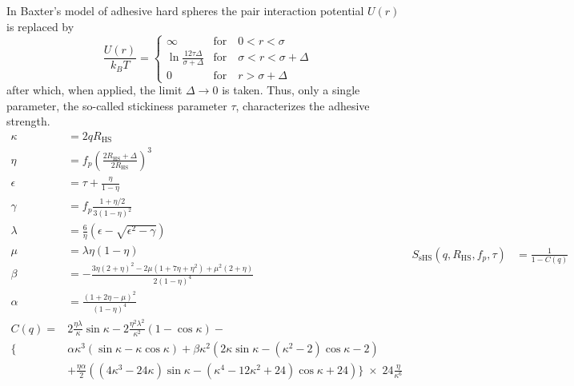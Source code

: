 In Baxter's model \cite{Baxter1968,Robertus1989,Kruif1989,Barboy1974,Menon1991,Menon1991a}
of adhesive hard spheres the pair interaction potential $U(r)$ is replaced by
\begin{equation}
\frac{U(r)}{k_BT} =
 \begin{cases}
      \infty    & \text{for} \quad 0<r<\sigma \\
      \ln\frac{12\tau\Delta}{\sigma+\Delta} & \text{for} \quad \sigma<r<\sigma+\Delta \\
      0         & \text{for} \quad r>\sigma+\Delta
   \end{cases}
\end{equation}
after which, when applied, the limit $\Delta \to 0$ is taken.
Thus, only a single parameter, the so-called stickiness parameter
$\tau$, characterizes the adhesive strength.
\begin{subequations}
\begin{align}
\kappa &= 2 q R_\text{HS} \\
\eta &= f_p \left(\frac{2R_\text{HS}+\Delta}{2R_\text{HS}}\right)^3\\
\epsilon &= \tau+\frac{\eta}{1-\eta} \\
\gamma &= f_p\frac{1+\eta/2}{3\left(1-\eta\right)^2} \\
\lambda &= \frac{6}{\eta} \left(\epsilon-\sqrt{\epsilon^2-\gamma}\right)\\
\mu &= \lambda \eta (1-\eta) \\
\beta &= -\frac{3\eta \left(2+\eta\right)^2-2\mu \left(1+7\eta+\eta^2\right)+\mu^2(2+\eta)}{2\left(1-\eta\right)^4}\\
\alpha &= \frac{\left(1+2\eta-\mu\right)^2}{\left(1-\eta\right)^4}\\[5mm]
C(q) = & 2\frac{\eta\lambda}{\kappa}\sin\kappa
        -2\frac{\eta^2\lambda^2}{\kappa^2}\left(1-\cos\kappa\right) -\\
   \Big\{ & \alpha\kappa^3(\sin\kappa-\kappa\cos\kappa)
           +\beta\kappa^2(2\kappa\sin\kappa-(\kappa^2-2)\cos\kappa-2)\nonumber\\
          & +\frac{\eta\alpha}{2}\left((4\kappa^3-24\kappa)\sin\kappa-(\kappa^4-12\kappa^2+24)\cos\kappa+24\right)
             \Big\} \;\times\;24\frac{\eta}{\kappa^6}\nonumber
\end{align}
\begin{align}
   S_\text{sHS}(q,R_\text{HS},f_p,\tau) & = \frac{1}{1-C(q)}
\end{align}
\end{subequations}



